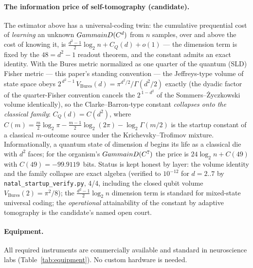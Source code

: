 \paragraph{The information price of self-tomography (candidate).}
The estimator above has a universal-coding twin: the cumulative
prequential cost of \emph{learning} an unknown $Gamma in D(C^d)$
from $n$ samples, over and above the cost of knowing it, is
$\tfrac{d^2-1}{2}\log_2 n + C_Q(d) + o(1)$ --- the dimension term is
fixed by the $48 = d^2{-}1$ readout theorem, and the constant admits an
exact identity. With the Bures metric normalized as one quarter of the
quantum (SLD) Fisher metric --- this paper's standing convention --- the
Jeffreys-type volume of state space obeys
$2^{\,d^2-1}\,V_{\mathrm{Bures}}(d) = \pi^{d^2/2}/\Gamma(d^2/2)$
exactly (the dyadic factor of the quarter-Fisher convention cancels the
$2^{\,1-d^2}$ of the Sommers--\.Zyczkowski volume identically), so the
Clarke--Barron-type constant \emph{collapses onto the classical family}:
$C_Q(d) = C(d^2)$, where $C(m) = \tfrac{m}{2}\log_2\pi -
\tfrac{m-1}{2}\log_2(2\pi) - \log_2\Gamma(m/2)$ is the startup constant
of a classical $m$-outcome source under the Krichevsky--Trofimov
mixture. Informationally, a quantum state of dimension $d$ begins its
life as a classical die with $d^2$ faces; for the organism's
$Gamma in D(C^7)$ the price is $24\log_2 n + C(49)$ with
$C(49) = -99.9119$~bits. Status is kept honest by layer: the volume
identity and the family collapse are exact algebra (verified to
$10^{-12}$ for $d = 2..7$ by \texttt{natal\_startup\_verify.py}, 4/4,
including the closed qubit volume $V_{\mathrm{Bures}}(2) = \pi^2/8$);
the $\tfrac{d^2-1}{2}\log_2 n$ dimension term is standard for
mixed-state universal coding; the \emph{operational} attainability of
the constant by adaptive tomography is the candidate's named open
court.

\paragraph{Equipment.}
All required instruments are commercially available and standard in
neuroscience labs (Table~\ref{tab:equipment}). No custom hardware is needed.

